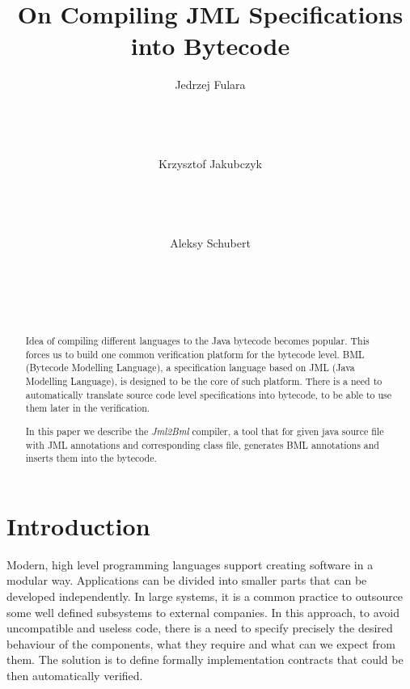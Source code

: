 \documentclass{acm_proc_article-sp}
\author{
\alignauthor
Jedrzej Fulara\\
\affaddr{Institute of Informatics}\\
\affaddr{University of Warsaw}\\
\affaddr{ul. Banacha 2}\\
\affaddr{02-097 Warsaw, Poland}\\
\email{fulara@mimuw.edu.pl}
\alignauthor
Krzysztof Jakubczyk\\
\affaddr{Institute of Informatics}\\
\affaddr{University of Warsaw}\\
\affaddr{ul. Banacha 2}\\
\affaddr{02-097 Warsaw, Poland}\\
\email{kjk@mimuw.edu.pl}
\alignauthor
Aleksy Schubert\\
\affaddr{Institute of Informatics}\\
\affaddr{University of Warsaw}\\
\affaddr{ul. Banacha 2}\\
\affaddr{02-097 Warsaw, Poland}\\
\email{alx@mimuw.edu.pl}
}
\title{On Compiling JML Specifications into Bytecode}
\begin{document}
\maketitle


\maketitle
\begin{abstract}
Idea of compiling different languages to the Java bytecode becomes popular. This forces us to build one common verification platform for the bytecode level. BML (Bytecode Modelling Language), a specification language based on JML (Java Modelling Language), is designed to be the core of such platform. There is a need to automatically translate source code level specifications into bytecode, to be able to use them later in the verification. 

In this paper we describe the \textit{Jml2Bml} compiler, a tool that for given java source file with JML annotations and corresponding class file, generates BML annotations and inserts them into the bytecode.
\end{abstract}
\section{Introduction}
Modern, high level programming languages support creating software in a modular way. Applications can be divided into smaller parts that can be developed independently. In large systems, it is a common practice to outsource some well defined subsystems to external companies. In this approach, to avoid uncompatible and useless code,  there is a need to specify precisely the desired behaviour of the components, what they require and what can we expect from them. The solution is to define formally implementation contracts that could be then automatically verified.
\end{document}
